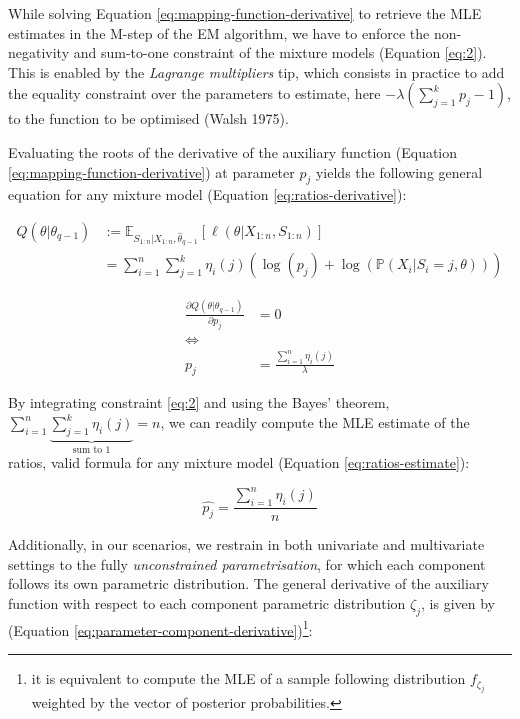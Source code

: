 While solving Equation \eqref{eq:mapping-function-derivative} to retrieve the MLE estimates in the M-step of the EM algorithm, we have to enforce the non-negativity and sum-to-one constraint of the mixture models (Equation
\eqref{eq:2}). This is enabled by the \emph{Lagrange multipliers} tip, which consists in practice to add the equality constraint over the parameters to estimate, here \(-\lambda (\sum_{j=1}^k p_j -1)\), to the function to be optimised (Walsh 1975).

Evaluating the roots of the derivative of the auxiliary function
(Equation \eqref{eq:mapping-function-derivative}) at parameter \(p_j\) yields the following general
equation for any mixture model (Equation \eqref{eq:ratios-derivative}):

\begin{equation}
\begin{split}
Q(\theta|\theta_{q-1}) & := \mathbb{E}_{S_{1:n}| X_{1:n}, \hat{\theta}_{q-1}} \left[\ell(\theta | X_{1:n}, S_{1:n})\right] \\
&=\sum_{i=1}^n \sum_{j=1}^k \eta_{i}(j) \left( \log (p_j) +  \log (\mathbb{P}(X_i|S_i=j, \theta)) \right)
\end{split}
\label{eq:8}
\end{equation}

\begin{equation}
\begin{split}
\frac{\partial Q(\theta|\theta_{q-1})}{\partial p_j} &=0 \\
 \Longleftrightarrow &\\
p_j&=\frac{\sum_{i=1}^n \eta_{i}(j)}{\lambda}
\end{split}
\label{eq:ratios-derivative}
\end{equation}

By integrating constraint \eqref{eq:2} and using the Bayes' theorem,
\(\sum_{i=1}^n \underbrace{\sum_{j=1}^k \eta_i(j)}_{\text{sum to 1}}=n\), we can readily compute the MLE estimate of the
ratios, valid formula for any mixture model (Equation \eqref{eq:ratios-estimate}):

\begin{equation}
\hat{p_j}= \frac{\sum_{i=1}^n \eta_{i}(j)}{n}
\label{eq:ratios-estimate}
\end{equation}

Additionally, in our scenarios, we restrain in both univariate and
multivariate settings to the fully \emph{unconstrained parametrisation}, for which each
component follows its own parametric distribution. The general
derivative of the auxiliary function with respect to each
component parametric distribution \(\zeta_j\), is given by (Equation
\eqref{eq:parameter-component-derivative})\footnote{ it is equivalent to compute the MLE of a sample following distribution \(f_{\zeta_j}\) weighted by the vector of posterior probabilities.}:

